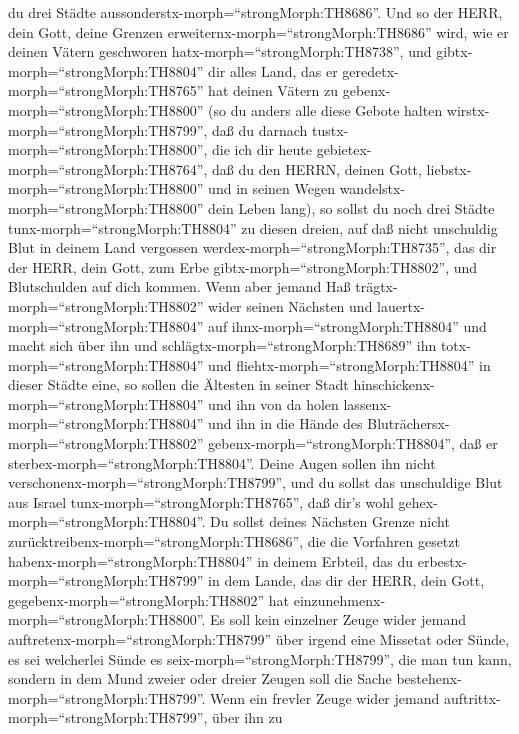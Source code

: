 du drei Städte aussonderstx-morph=``strongMorph:TH8686''. 
Und so der HERR, dein Gott, deine Grenzen
erweiternx-morph=``strongMorph:TH8686'' wird, wie er deinen Vätern
geschworen hatx-morph=``strongMorph:TH8738'', und
gibtx-morph=``strongMorph:TH8804'' dir alles Land, das er
geredetx-morph=``strongMorph:TH8765'' hat deinen Vätern zu
gebenx-morph=``strongMorph:TH8800''  (so du anders alle
diese Gebote halten wirstx-morph=``strongMorph:TH8799'', daß du darnach
tustx-morph=``strongMorph:TH8800'', die ich dir heute
gebietex-morph=``strongMorph:TH8764'', daß du den HERRN, deinen Gott,
liebstx-morph=``strongMorph:TH8800'' und in seinen Wegen
wandelstx-morph=``strongMorph:TH8800'' dein Leben lang), so sollst du
noch drei Städte tunx-morph=``strongMorph:TH8804'' zu diesen dreien,
 auf daß nicht unschuldig Blut in deinem Land vergossen
werdex-morph=``strongMorph:TH8735'', das dir der HERR, dein Gott, zum
Erbe gibtx-morph=``strongMorph:TH8802'', und Blutschulden auf dich
kommen.  Wenn aber jemand Haß
trägtx-morph=``strongMorph:TH8802'' wider seinen Nächsten und
lauertx-morph=``strongMorph:TH8804'' auf
ihnx-morph=``strongMorph:TH8804'' und macht sich über ihn und
schlägtx-morph=``strongMorph:TH8689'' ihn
totx-morph=``strongMorph:TH8804'' und
fliehtx-morph=``strongMorph:TH8804'' in dieser Städte eine,
 so sollen die Ältesten in seiner Stadt
hinschickenx-morph=``strongMorph:TH8804'' und ihn von da holen
lassenx-morph=``strongMorph:TH8804'' und ihn in die Hände des
Bluträchersx-morph=``strongMorph:TH8802''
gebenx-morph=``strongMorph:TH8804'', daß er
sterbex-morph=``strongMorph:TH8804''.  Deine Augen sollen
ihn nicht verschonenx-morph=``strongMorph:TH8799'', und du sollst das
unschuldige Blut aus Israel tunx-morph=``strongMorph:TH8765'', daß dir's
wohl gehex-morph=``strongMorph:TH8804''.  Du sollst deines
Nächsten Grenze nicht zurücktreibenx-morph=``strongMorph:TH8686'', die
die Vorfahren gesetzt habenx-morph=``strongMorph:TH8804'' in deinem
Erbteil, das du erbestx-morph=``strongMorph:TH8799'' in dem Lande, das
dir der HERR, dein Gott, gegebenx-morph=``strongMorph:TH8802'' hat
einzunehmenx-morph=``strongMorph:TH8800''.  Es soll kein
einzelner Zeuge wider jemand auftretenx-morph=``strongMorph:TH8799''
über irgend eine Missetat oder Sünde, es sei welcherlei Sünde es
seix-morph=``strongMorph:TH8799'', die man tun kann, sondern in dem Mund
zweier oder dreier Zeugen soll die Sache
bestehenx-morph=``strongMorph:TH8799''.  Wenn ein frevler
Zeuge wider jemand auftrittx-morph=``strongMorph:TH8799'', über ihn zu
